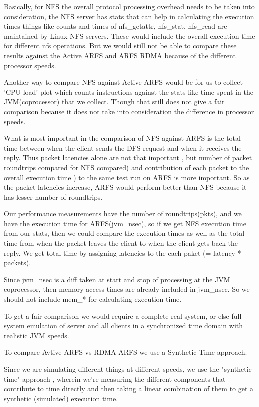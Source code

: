 \documentclass[10pt]{article}
\begin{document}
Basically, for NFS the overall protocol processing overhead needs to be
taken into consideration, the NFS server has stats that can help
in calculating the execution times things like counts and times of
nfs\_getattr, nfs\_stat, nfs\_read are maintained by Linux NFS servers. These
would include the overall execution time for different nfs operations. But 
we would still not be able to compare these results against the Active ARFS
and ARFS RDMA because of the different processor speeds.

Another way to compare NFS against Active ARFS would be for us to collect
'CPU load' plot which counts instructions against the stats like
time spent in the JVM(coprocessor) that we collect. Though that still
does not give a fair comparison because it does not take into consideration
the difference in processor speeds.

What is most important in the comparison of NFS against ARFS is the total
time between when the client sends the DFS request and when it receives the
reply. Thus packet latencies alone are not that important , but number of packet
roundtrips compared for NFS compared( and contribution of each packet to the
overall execution time ) to the same test run on ARFS is more important. So
as the packet latencies increase, ARFS would perform better than NFS because
it has lesser number of roundtrips.

Our performance measurements have the number of roundtrips(pkts), and we have
the execution time for ARFS(jvm\_nsec), so if we get NFS execution time from
our stats, then we could compare the execution times as well as the total time
from when the packet leaves the client to when the client gets back the reply.
We get total time by assigning latencies to the each paket (= latency * packets).

Since jvm\_nsec is a diff taken at start and stop of processing at the JVM coprocessor,
then memory access times are already included in jvm\_nsec. So we should not include mem\_* for
calculating execution time.

To get a fair comparison we would require a complete real system, or else full-system emulation of
server and all clients in a synchronized time domain with realistic JVM speeds.

To compare Avtive ARFS vs RDMA ARFS we use a Synthetic Time approach.

Since we are simulating different things at different speeds, we use the "synthetic time"
approach , wherein we're measuring the different components that contribute to time directly
and then taking a linear combination of them to get a synthetic (simulated) execution time.
\end{document}
